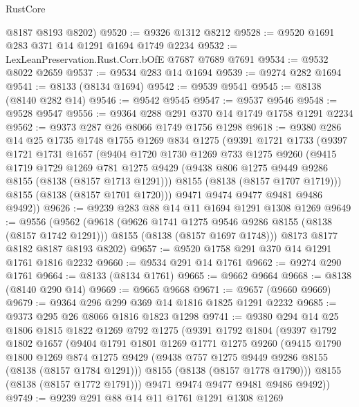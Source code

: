 \begin{lexlean}{RustCore}
\begin{coremodule}
      @8187
      @8193
      @8202)
@9520 := @9326 @1312 @8212
@9528 := @9520 @1691 @283 @371 @14 @1291 @1694 @1749 @2234
@9532 := LexLeanPreservation.Rust.Corr.bOfE @7687 @7689 @7691
@9534 := @9532 @8022 @2659
@9537 := @9534 @283 @14 @1694
@9539 := @9274 @282 @1694
@9541 := @8133 (@8134 @1694)
@9542 := @9539 @9541
@9545 := @8138 (@8140 @282 @14)
@9546 := @9542 @9545
@9547 := @9537 @9546
@9548 := @9528 @9547
@9556 := @9364 @288 @291 @370 @14 @1749 @1758 @1291 @2234
@9562 := @9373 @287 @26 @8066 @1749 @1756 @1298
@9618 := @9380
    @286
    @14
    @25
    @1735
    @1748
    @1755
    @1269
    @834
    @1275
    (@9391
      @1721
      @1733
      (@9397
        @1721
        @1731
        @1657
        (@9404
          @1720
          @1730
          @1269
          @733
          @1275
          @9260
          (@9415
            @1719
            @1729
            @1269
            @781
            @1275
            @9429
            (@9438 @806 @1275 @9449 @9286 @8155 (@8138 (@8157 @1713 @1291)))
            @8155
            (@8138 (@8157 @1707 @1719)))
          @8155
          (@8138 (@8157 @1701 @1720)))
        @9471
        @9474
        @9477
        @9481
        @9486
        @9492))
@9626 := @9239 @283 @88 @14 @11 @1694 @1291 @1308 @1269
@9649 := @9556
    (@9562
      (@9618
        (@9626 @1741 @1275 @9546 @9286 @8155 (@8138 (@8157 @1742 @1291)))
        @8155
        (@8138 (@8157 @1697 @1748)))
      @8173
      @8177
      @8182
      @8187
      @8193
      @8202)
@9657 := @9520 @1758 @291 @370 @14 @1291 @1761 @1816 @2232
@9660 := @9534 @291 @14 @1761
@9662 := @9274 @290 @1761
@9664 := @8133 (@8134 @1761)
@9665 := @9662 @9664
@9668 := @8138 (@8140 @290 @14)
@9669 := @9665 @9668
@9671 := @9657 (@9660 @9669)
@9679 := @9364 @296 @299 @369 @14 @1816 @1825 @1291 @2232
@9685 := @9373 @295 @26 @8066 @1816 @1823 @1298
@9741 := @9380
    @294
    @14
    @25
    @1806
    @1815
    @1822
    @1269
    @792
    @1275
    (@9391
      @1792
      @1804
      (@9397
        @1792
        @1802
        @1657
        (@9404
          @1791
          @1801
          @1269
          @1771
          @1275
          @9260
          (@9415
            @1790
            @1800
            @1269
            @874
            @1275
            @9429
            (@9438 @757 @1275 @9449 @9286 @8155 (@8138 (@8157 @1784 @1291)))
            @8155
            (@8138 (@8157 @1778 @1790)))
          @8155
          (@8138 (@8157 @1772 @1791)))
        @9471
        @9474
        @9477
        @9481
        @9486
        @9492))
@9749 := @9239 @291 @88 @14 @11 @1761 @1291 @1308 @1269

\end{coremodule}
\end{lexlean}
